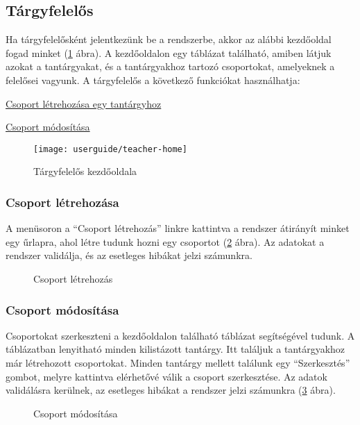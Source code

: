 \subsection{Tárgyfelelős}\label{step:teacher-role}
Ha tárgyfelelősként jelentkezünk be a rendszerbe, akkor az alábbi kezdőoldal fogad minket (\ref{fig:teacher-home} ábra).
A kezdőoldalon egy táblázat található, amiben látjuk azokat a tantárgyakat, és a tantárgyakhoz tartozó csoportokat, amelyeknek a felelősei vagyunk.
A tárgyfelelős a következő funkciókat használhatja:
\begin{compactitem}
    \item \hyperref[step:teacher-create-course]{Csoport létrehozása egy tantárgyhoz}
    \item \hyperref[step:teacher-edit-course]{Csoport módosítása}
\end{compactitem}
\begin{figure}[H]
	\centering
	\texttt{[image: userguide/teacher-home]}
	\caption{Tárgyfelelős kezdőoldala}
	\label{fig:teacher-home}
\end{figure}
\subsubsection{Csoport létrehozása}
\label{step:teacher-create-course}
A menüsoron a ``Csoport létrehozás'' linkre kattintva a rendszer átirányít minket egy űrlapra, ahol létre tudunk hozni egy csoportot (\ref{fig:teacher-create-course} ábra). Az adatokat a rendszer validálja, és az esetleges hibákat jelzi számunkra.
\begin{figure}[H]
	\centering
	\hspace{5pt}
	\caption{Csoport létrehozás}
	\label{fig:teacher-create-course}
\end{figure}
\subsubsection{Csoport módosítása}
\label{step:teacher-edit-course}
Csoportokat szerkeszteni a kezdőoldalon található táblázat segítségével tudunk. A táblázatban lenyitható minden kilistázott tantárgy. Itt találjuk a tantárgyakhoz már létrehozott csoportokat. Minden tantárgy mellett találunk egy ``Szerkesztés'' gombot, melyre kattintva elérhetővé válik a csoport szerkesztése. Az adatok validálásra kerülnek, az esetleges hibákat a rendszer jelzi számunkra (\ref{fig:teacher-edit-course} ábra).
\begin{figure}[H]
	\centering
	\hspace{5pt}
	\caption{Csoport módosítása}
	\label{fig:teacher-edit-course}
\end{figure}
